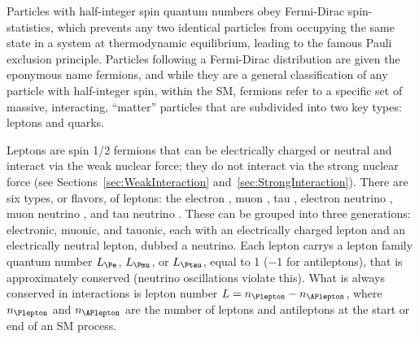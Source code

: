 
Particles with half-integer spin quantum numbers obey Fermi-Dirac spin-statistics, which prevents any two identical particles from occupying the same state in a system at thermodynamic equilibrium, leading to the famous Pauli exclusion principle. Particles following a Fermi-Dirac distribution are given the eponymous name fermions, and while they are a general classification of any particle with half-integer spin, within the SM, fermions refer to a specific set of massive, interacting, ``matter'' particles that are subdivided into two key types: leptons and quarks. 


Leptons \Plepton are spin 1/2 fermions that can be electrically charged or neutral and interact via the weak nuclear force; they do not interact via the strong nuclear force (see Sections~\ref{sec:WeakInteraction} and~\ref{sec:StrongInteraction}). There are six types, or flavors, of leptons: the electron \Pelectron, muon \Pmuon, tau \Ptauon, electron neutrino \Pnue, muon neutrino \Pnum, and tau neutrino \Pnut. These can be grouped into three generations: electronic, muonic, and tauonic, each with an electrically charged lepton and an electrically neutral lepton, dubbed a neutrino. Each lepton carrys a lepton family quantum number $L_{\Pe}$, $L_{\Pmu}$, or $L_{\Ptau}$, equal to 1 (\num{-1} for antileptons), that is approximately conserved (neutrino oscillations violate this). What is always conserved in interactions is lepton number $L = n_{\Plepton} - n_{\APlepton}$, where $n_{\Plepton}$ and $n_{\APlepton}$ are the number of leptons and antileptons at the start or end of an SM process.

